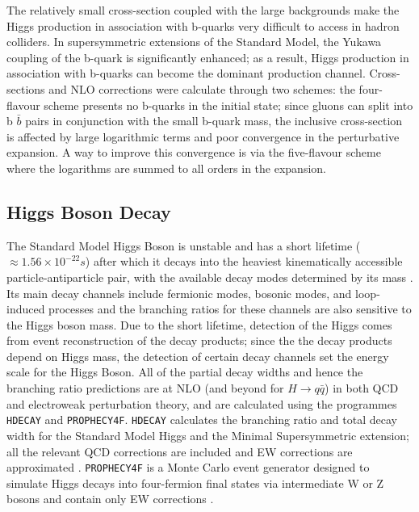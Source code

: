 \documentclass[a4paper,11pt]{article}
\begin{document}
The relatively small cross-section coupled with the large backgrounds make the Higgs production in association with b-quarks very difficult to access in hadron colliders. In supersymmetric extensions of the Standard Model, the Yukawa coupling of the b-quark is significantly enhanced; as a result, Higgs production in association with b-quarks can become the dominant production channel. Cross-sections and NLO corrections were calculate through two schemes: the four-flavour scheme presents no b-quarks in the initial state; since gluons can split into b $\bar{b}$ pairs in conjunction with the small b-quark mass, the inclusive cross-section is affected by large logarithmic terms and poor convergence in the perturbative expansion. A way to improve this convergence is via the five-flavour scheme where the logarithms are summed to all orders in the expansion\cite{Buescher:2005re}. \\





\subsection{Higgs Boson Decay}\label{sec: Higgs Decay}
The Standard Model Higgs Boson is unstable and has a short lifetime ($ \approx 1.56 \times 10^{-22}s$) after which it decays into the heaviest kinematically accessible particle-antiparticle pair, with the available decay modes determined by its mass \cite{CMS_life}. Its main decay channels include fermionic modes, bosonic modes, and loop-induced processes and the branching ratios for these channels are also sensitive to the Higgs boson mass. Due to the short lifetime, detection of the Higgs comes from event reconstruction of the decay products; since the the decay products depend on Higgs mass, the detection of certain decay channels set the energy scale for the Higgs Boson. All of the partial decay widths and hence the branching ratio predictions are at NLO (and beyond for $H \rightarrow q\bar{q}$) in both QCD and electroweak perturbation theory, and are calculated using the programmes \verb|HDECAY| and \verb|PROPHECY4F|. \verb|HDECAY| calculates the branching ratio and total decay width for the Standard Model Higgs and the Minimal Supersymmetric extension; all the relevant QCD corrections are included and EW corrections are approximated \cite{Spira:1996if}. \verb|PROPHECY4F| is a Monte Carlo event generator designed to simulate Higgs decays into four-fermion final states via intermediate W or Z bosons and contain only EW corrections \cite{Bredenstein:2006ha}. \\
\end{document}
